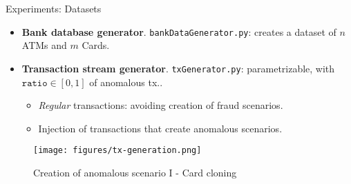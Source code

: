 \begin{comment}
\begin{frame}{Experiments: Datasets}
\begin{itemize}
    \item \textbf{No public real bank dataset found}. Confidential and private nature of bank data.
    \vspace{1em}
    \item \textbf{Synthetic bank dataset generation tool}: 
    \begin{itemize}
        \item[(i)] Bank database.
        \vspace{0.5em}
        \item[(ii)] Transactions stream.
    \end{itemize}
    \vspace{1em}
    \begin{itemize}
        \item[$\Rightarrow$] Customisable data generation.
        \vspace{0.5em}
        \item[$\Rightarrow$] Based on a previously developed synthetic bank database \emph{Wisabi Bank Dataset} (publicly available). Used as a reference for the \textbf{geographical} distribution of \textbf{ATM} locations and \textbf{card/client} transaction \textbf{\emph{behavior}}.
        \vspace{0.5em}
        \item[$\Rightarrow$] Left as a public available tool.\footnote{\url{https://github.com/FCanfran/ATM-DP/tree/main/gdb}}
    \end{itemize}    
\end{itemize}
\end{frame}
\end{comment}

\begin{frame}{Experiments: Datasets}
\begin{itemize}
    \item \textbf{Bank database generator}. \texttt{bankDataGenerator.py}: creates a dataset of $n$ ATMs and $m$ Cards.
    \vspace{0.4em}
    \item \textbf{Transaction stream generator}. \texttt{txGenerator.py}: parametrizable, with $\texttt{ratio} \in [0,1]$ of anomalous tx..
    \vspace{0.2em}
    \begin{itemize}
        \item \emph{Regular} transactions: avoiding creation of fraud scenarios.
        \vspace{0.3em}
        \item Injection of transactions that create anomalous scenarios.
    \end{itemize}
\end{itemize}
\begin{figure}
    \centering
    \texttt{[image: figures/tx-generation.png]}
    \caption{Creation of anomalous scenario I - Card cloning}
\end{figure}
\end{frame}

